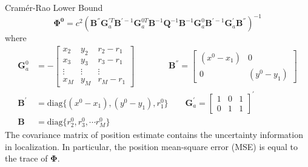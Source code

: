 \documentclass[10pt]{beamer}
\begin{document}
\begin{frame}{Cram\'{e}r-Rao Lower Bound}
  \begin{equation*}
    \boldsymbol{\Phi^0} = c^2 ( \textbf{B}^{''} \textbf{G}_a^{'T} \textbf{B}^{'-1} \textbf{G}_a^{0T} \textbf{B}^{-1} \textbf{Q}^{-1} \textbf{B}^{-1} \textbf{G}_a^{0}  \textbf{B}^{'-1} \textbf{G}_a^{'} \textbf{B}^{''} )^{-1}
  \end{equation*}
  where
  \begin{align*}
     \textbf{G}_a^0   &= - \begin{bmatrix} x_2  & y_2 & r_2-r_1 \\   x_3  & y_3 & r_3-r_1 \\ \vdots & \vdots & \vdots \\  x_M  & y_M & r_M-r_1 \end{bmatrix} \qquad \qquad
     \textbf{B}^{''}  = \begin{bmatrix} (x^0 - x_1) & 0 \\  0 & (y^0 - y_1)\end{bmatrix}\\
     \textbf{B}^{'}\  &= \text{diag}\{(x^0 - x_1),(y^0 - y_1),r_1^0\}\qquad
     \textbf{G}_a^{'} = \begin{bmatrix} 1 & 0 & 1 \\  0 & 1 & 1\end{bmatrix}^{'} \\
     \textbf{B}  \ \  &= \text{diag}\{r_2^0, r_3^0, \cdots r_M^0\}
   \end{align*}
   The covariance matrix of position estimate contains the uncertainty information in localization.
   In particular, the position mean-square error (\textsc{MSE}) is equal to the \alert{trace} of $\boldsymbol{\Phi}$.
\end{frame}
\end{document}
